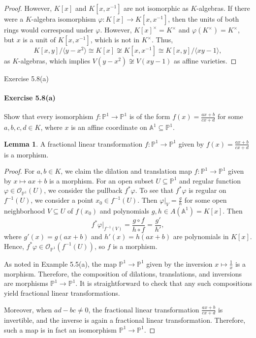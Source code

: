 \documentclass[12pt]{article}
\newenvironment{fullbox}{\begin{lrbox}{\savefullbox}\begin{minipage}{\dimexpr\textwidth-2\fboxsep\relax}}{\end{minipage}\end{lrbox}\begin{center}\framebox[\textwidth]{\usebox{\savefullbox}}\end{center}}
\newenvironment{pbox}[1][]{\begin{fullbox}\ifx#1\empty\else\paragraph{#1}\fi}{\end{fullbox}}
\theoremstyle{definition}
\newtheorem{lemma}{Lemma}
\renewcommand{\phi}{\varphi}
\newcommand{\A}{\mathbb{A}}
\renewcommand{\P}{\mathbb{P}}
\newcommand{\<}{\langle}
\renewcommand{\>}{\rangle}
\renewcommand{\O}{\mathscr{O}}
\newcommand{\isom}{\cong}
\begin{document}
\begin{proof}
    However, $K[x]$ and $K[x, x^{-1}]$ are not isomorphic as $K$-algebras. If there were a $K$-algebra isomorphism $\phi : K[x] \to K[x, x^{-1}]$, then the units of both rings would correspond under $\phi$. However, $K[x]^\times = K^\times$ and $\phi(K^\times) = K^\times$, but $x$ is a unit of $K[x, x^{-1}]$, which is not in $K^\times$. Thus,
    \[
        K[x, y]/\<y - x^2\> \isom K[x] \not\isom K[x, x^{-1}] \isom K[x, y]/\<xy - 1\>,
    \]
    as $K$-algebras, which implies $V(y - x^2) \not\isom V(xy - 1)$ as affine varieties.

\end{proof}




\newpage
\begin{pbox}[Exercise 5.8(a)]
    Show that every isomorphism $f : \P^1 \to \P^1$ is of the form $f(x) = \frac{ax + b}{cx + d}$ for some $a, b, c, d \in K$, where $x$ is an affine coordinate on $\A^1 \subseteq \P^1$.
\end{pbox}



\begin{lemma}
    A fractional linear transformation $f : \P^1 \to \P^1$ given by $f(x) = \frac{ax + b}{cx + d}$ is a morphism.
\end{lemma}

\begin{proof}
    For $a, b \in K$, we claim the dilation and translation map $f : \P^1 \to \P^1$ given by $x \mapsto ax + b$ is a morphism. For an open subset $U \subseteq \P^1$ and regular function $\phi \in \O_{\P^1}(U)$, we consider the pullback $f^*\phi$. To see that $f^*\phi$ is regular on $f^{-1}(U)$, we consider a point $x_0 \in f^{-1}(U)$. Then $\phi|_V = \frac{g}{h}$ for some open neighborhood $V \subseteq U$ of $f(x_0)$ and polynomials $g, h \in A(\A^1) = K[x]$. Then
    \[
        f^*\phi|_{f^{-1}(V)} = \frac{g \circ f}{h \circ f} = \frac{g'}{h'},
    \]
    where $g'(x) = g(ax + b)$ and $h'(x) = h(ax + b)$ are polynomials in $K[x]$. Hence, $f^*\phi \in \O_{\P^1}(f^{-1}(U))$, so $f$ is a morphism.
    
    As noted in Example 5.5(a), the map $\P^1 \to \P^1$ given by the inversion $x \mapsto \frac{1}{x}$ is a morphism. Therefore, the composition of dilations, translations, and inversions are morphisms $\P^1 \to \P^1$. It is straightforward to check that any such compositions yield fractional linear transformations.
    
    Moreover, when $ad - bc \ne 0$, the fractional linear transformation $\frac{ax + b}{cx + d}$ is invertible, and the inverse is again a fractional linear transformation. Therefore, such a map is in fact an isomorphism $\P^1 \to \P^1$.

\end{proof}
\end{document}

